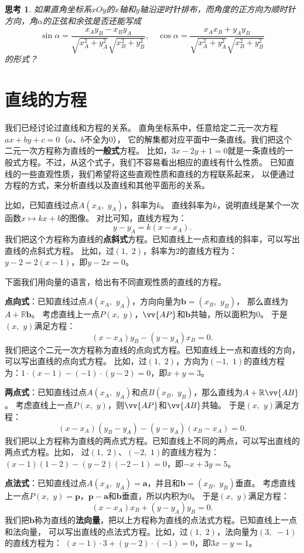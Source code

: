 \documentclass[12pt,UTF8]{ctexbook}
\newtheorem{sk}{思考}[section]
\begin{document}
\begin{sk}
    如果直角坐标系$xOy$的$x$轴和$y$轴沿逆时针排布，而角度的正方向为顺时针方向，角$\alpha$的正弦和余弦是否还能写成
    $$ \sin \alpha = \frac{x_Ay_B - x_By_A}{\sqrt{x_A^2 + y_A^2}\sqrt{x_B^2 + y_B^2}}, \quad \cos \alpha = \frac{x_Ax_B + y_Ay_B}{\sqrt{x_A^2 + y_A^2} \sqrt{x_B^2 + y_B^2}}$$
    的形式？
\end{sk}

\section{直线的方程}
我们已经讨论过直线和方程的关系。
直角坐标系中，任意给定二元一次方程$ax + by + c = 0$（$a$、$b$不全为$0$），
它的解集都对应平面中一条直线。我们把这个二元一次方程称为直线的\textbf{一般式}方程。
比如，$3x - 2y + 1 = 0$就是一条直线的一般式方程。不过，从这个式子，我们不容易看出相应的直线有什么性质。
已知直线的一些直观性质，我们希望将这些直观性质和直线的方程联系起来，
以便通过方程的方式，来分析直线以及直线和其他平面形的关系。

比如，已知直线过点$A(x_A,\,\, y_A)$，斜率为$k$。
直线斜率为$k$，说明直线是某个一次函数$x \mapsto kx + b$的图像。
对比可知，直线方程为：
$$y - y_A = k(x - x_A).$$
我们把这个方程称为直线的\textbf{点斜式}方程。已知直线上一点和直线的斜率，可以写出直线的点斜式方程。
比如，过$(1,\,\,2)$，斜率为$2$的直线方程为：$y - 2 = 2(x - 1)$，即$y - 2x = 0$。

下面我们用向量的语言，给出有不同直观性质的直线的方程。

\textbf{点向式}：已知直线过点$A(x_A,\,\, y_A)$，方向向量为$\mathbf{b} = (x_B,\,\, y_B)$，
那么直线为$A + \mathbb{R}\mathbf{b}$。
考虑直线上一点$P(x,\,\, y)$，$\vv{AP}$和$\mathbf{b}$共轴，所以面积为$0$。
于是$(x,\,\,y)$满足方程：
$$(x - x_A) y_B - (y - y_A) x_B = 0.$$
我们把这个二元一次方程称为直线的点向式方程。已知直线上一点和直线的方向，可以写出直线的点向式方程。
比如，过$(1,\,\,2)$，方向为$(-1,\,\,1)$的直线方程为：$1\cdot(x - 1) - (-1)\cdot(y - 2) = 0$，即$x + y = 3$。

\textbf{两点式}：已知直线过点$A(x_A,\,\, y_A)$和点$B(x_B,\,\, y_B)$，那么直线为$A + \mathbb{R}\vv{AB}$。
考虑直线上一点$P(x,\,\, y)$，则$\vv{AP}$和$\vv{AB}$共轴。
于是$(x,\,\,y)$满足方程：
$$(x - x_A) (y_B - y_A) - (y - y_A) (x_B - x_A) = 0.$$
我们把以上方程称为直线的两点式方程。已知直线上不同的两点，可以写出直线的两点式方程。比如，
过$(1,\,\,2)$、$(-2,\,\,1)$的直线方程为：$(x - 1)(1 - 2) - (y - 2)(-2 - 1) = 0$，即$-x + 3y = 5$。

\textbf{点法式}：已知直线过点$A(x_A,\,\, y_A) = \mathbf{a}$，并且和$\mathbf{b} = (x_B,\,\, y_B)$垂直。
考虑直线上一点$P(x,\,\, y) = \mathbf{p}$，$\mathbf{p} - \mathbf{a}$和$\mathbf{b}$垂直，所以内积为$0$。
于是$(x,\,\,y)$满足方程：
$$(x - x_A) x_B + (y - y_A) y_B = 0.$$
我们把$\mathbf{b}$称为直线的\textbf{法向量}，把以上方程称为直线的点法式方程。已知直线上一点和法向量，
可以写出直线的点法式方程。比如，过$(1,\,\,2)$，法向量为$(3,\,\,-1)$的直线方程为：
$(x - 1)\cdot 3 + (y - 2)\cdot (-1) = 0$，即$3x - y= 1$。
\end{document}
